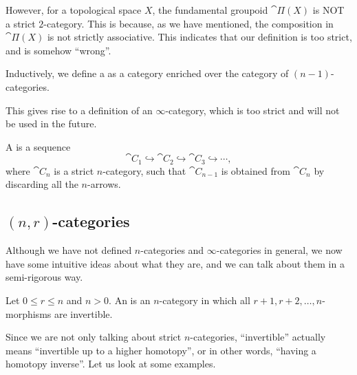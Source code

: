 However, for a topological space $X$,
the fundamental groupoid $\cat{Π}(X)$ is NOT a strict $2$-category.
This is because, as we have mentioned,
the composition in $\cat{Π}(X)$ is not strictly associative.
This indicates that our definition is too strict,
and is somehow ``wrong''.

\begin{definition}
    Inductively, we define a  as
    a category enriched over the category of $(n-1)$-categories.
\end{definition}

This gives rise to a definition of an $\infty$-category,
which is too strict and will not be used in the future.

\begin{definition}
    A  is a sequence
    \[ \cat C_1\hookrightarrow\cat C_2\hookrightarrow\cat C_3\hookrightarrow\cdots, \]
    where $\cat C_n$ is a strict $n$-category,
    such that $\cat C_{n-1}$ is obtained from $\cat C_n$
    by discarding all the $n$-arrows.
\end{definition}

\subsection{\texorpdfstring{$(n,r)$}{(n, r)}-categories}

Although we have not defined $n$-categories and $\infty$-categories in general,
we now have some intuitive ideas about what they are,
and we can talk about them in a semi-rigorous way.

\begin{definition}
    Let $0\leq r\leq n$ and $n>0$.
    An 
    is an $n$-category in which
    all $r+1,r+2,\dotsc,n$-morphisms are invertible.
\end{definition}

Since we are not only talking about strict $n$-categories,
``invertible'' actually means ``invertible up to a higher homotopy'',
or in other words, ``having a homotopy inverse''.
Let us look at some examples.

